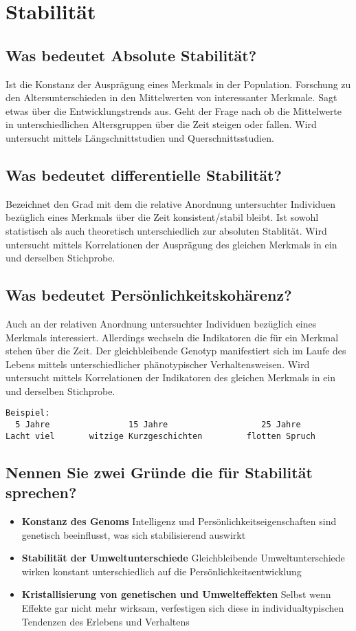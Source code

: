 \documentclass[a6paper,10pt,DIV=40]{scrartcl}
\begin{document}
\section{Stabilität}
\subsection{Was bedeutet Absolute Stabilität?}
Ist die Konstanz der Ausprägung eines Merkmals in der Population. Forschung zu den Altersunterschieden in den Mittelwerten von interessanter Merkmale. Sagt etwas über die Entwicklungstrends aus. Geht der Frage nach ob die Mittelwerte in unterschiedlichen Altersgruppen über die Zeit steigen oder fallen. Wird untersucht mittels Längschnittstudien und Querschnittsstudien.
\subsection{Was bedeutet differentielle Stabilität?}
Bezeichnet den Grad mit dem die relative Anordnung untersuchter Individuen bezüglich eines Merkmals über die Zeit konsistent/stabil bleibt. Ist sowohl statistisch als auch theoretisch unterschiedlich zur absoluten Stablität. Wird untersucht mittels Korrelationen der Ausprägung des gleichen Merkmals in ein und derselben Stichprobe.
\subsection{Was bedeutet Persönlichkeitskohärenz?}
Auch an der relativen Anordnung untersuchter Individuen bezüglich eines Merkmals interessiert. Allerdings wechseln die Indikatoren die für ein Merkmal stehen über die Zeit. Der gleichbleibende Genotyp manifestiert sich im Laufe des Lebens mittels unterschiedlicher phänotypischer Verhaltensweisen. Wird untersucht mittels Korrelationen der Indikatoren des gleichen Merkmals in ein und derselben Stichprobe.
\begin{Verbatim}[samepage=true, frame=single]
Beispiel:
  5 Jahre                15 Jahre                   25 Jahre
Lacht viel       witzige Kurzgeschichten         flotten Spruch
\end{Verbatim}
\subsection{Nennen Sie zwei Gründe die für Stabilität sprechen?}
\begin{itemize}
    \item \textbf{Konstanz des Genoms}
    Intelligenz und Persönlichkeitseigenschaften sind genetisch beeinflusst, was sich
    stabilisierend auswirkt
    \item \textbf{Stabilität der Umweltunterschiede}
    Gleichbleibende Umweltunterschiede wirken konstant unterschiedlich auf die
    Persönlichkeitsentwicklung
    \item \textbf{Kristallisierung von genetischen und Umwelteffekten}
    Selbst wenn Effekte gar nicht mehr wirksam, verfestigen sich diese in individualtypischen
    Tendenzen des Erlebens und Verhaltens
\end{itemize}
\end{document}
